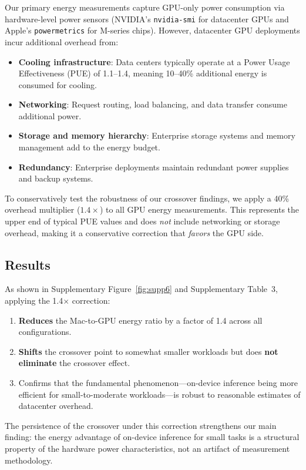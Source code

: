 \documentclass[11pt]{article}
\begin{document}
Our primary energy measurements capture GPU-only power consumption via hardware-level power sensors (NVIDIA's \texttt{nvidia-smi} for datacenter GPUs and Apple's \texttt{powermetrics} for M-series chips). However, datacenter GPU deployments incur additional overhead from:

\begin{itemize}
\item \textbf{Cooling infrastructure}: Data centers typically operate at a Power Usage Effectiveness (PUE) of 1.1--1.4, meaning 10--40\% additional energy is consumed for cooling.
\item \textbf{Networking}: Request routing, load balancing, and data transfer consume additional power.
\item \textbf{Storage and memory hierarchy}: Enterprise storage systems and memory management add to the energy budget.
\item \textbf{Redundancy}: Enterprise deployments maintain redundant power supplies and backup systems.
\end{itemize}

To conservatively test the robustness of our crossover findings, we apply a 40\% overhead multiplier ($1.4\times$) to all GPU energy measurements. This represents the upper end of typical PUE values and does \emph{not} include networking or storage overhead, making it a conservative correction that \emph{favors} the GPU side.

\subsection{Results}

As shown in Supplementary Figure~\ref{fig:supp6} and Supplementary Table~3, applying the 1.4$\times$ correction:

\begin{enumerate}
\item \textbf{Reduces} the Mac-to-GPU energy ratio by a factor of 1.4 across all configurations.
\item \textbf{Shifts} the crossover point to somewhat smaller workloads but does \textbf{not eliminate} the crossover effect.
\item Confirms that the fundamental phenomenon---on-device inference being more efficient for small-to-moderate workloads---is robust to reasonable estimates of datacenter overhead.
\end{enumerate}

The persistence of the crossover under this correction strengthens our main finding: the energy advantage of on-device inference for small tasks is a structural property of the hardware power characteristics, not an artifact of measurement methodology.
\end{document}
